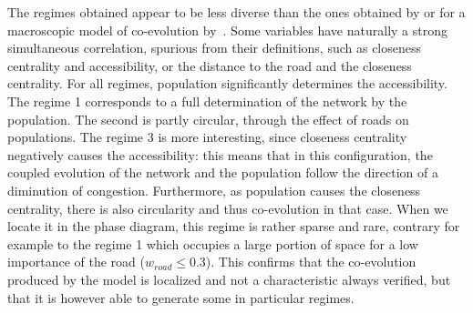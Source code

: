 The regimes obtained appear to be less diverse than the ones obtained by \cite{raimbault2017identification} or for a macroscopic model of co-evolution by~\cite{2018arXiv180409430R}. Some variables have naturally a strong simultaneous correlation, spurious from their definitions, such as closeness centrality and accessibility, or the distance to the road and the closeness centrality. For all regimes, population significantly determines the accessibility. The regime 1 corresponds to a full determination of the network by the population. The second is partly circular, through the effect of roads on populations. The regime 3 is more interesting, since closeness centrality negatively causes the accessibility: this means that in this configuration, the coupled evolution of the network and the population follow the direction of a diminution of congestion. Furthermore, as population causes the closeness centrality, there is also circularity and thus co-evolution in that case. When we locate it in the phase diagram, this regime is rather sparse and rare, contrary for example to the regime 1 which occupies a large portion of space for a low importance of the road ($w_{road} \leq 0.3$). This confirms that the co-evolution produced by the model is localized and not a characteristic always verified, but that it is however able to generate some in particular regimes.


